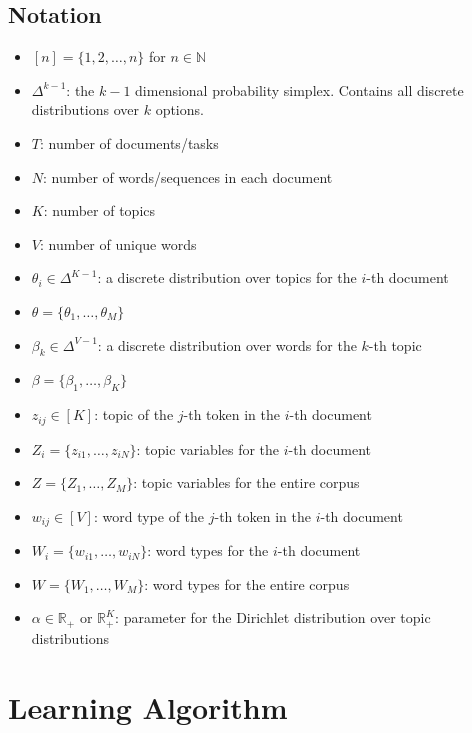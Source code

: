 \documentclass[letterpaper]{article}
\begin{document}
\begin{tcolorbox}
\subsection{Notation}
\begin{itemize}
        \item $[n] = \{1, 2, \dots, n\}$ for $n \in \mathbb{N}$
        \item $\Delta^{k-1}$: the $k-1$ dimensional probability simplex. Contains all discrete distributions over $k$ options.
        \item $T$: number of documents/tasks
        \item $N$: number of words/sequences in each document
        \item $K$: number of topics
        \item $V$: number of unique words
        \item $\theta_i \in \Delta^{K-1}$: a discrete distribution over topics for the $i$-th document
        \item $\theta = \{\theta_1, \dots, \theta_M\}$
        \item $\beta_k \in \Delta^{V-1}$: a discrete distribution over words for the $k$-th topic
        \item $\beta = \{\beta_1, \dots, \beta_K\}$
        \item $z_{ij} \in [K]$: topic of the $j$-th token in the $i$-th document
        \item $Z_i = \{z_{i1}, \dots, z_{iN}\}$: topic variables for the $i$-th document
        \item $Z = \{Z_1, \dots, Z_M\}$: topic variables for the entire corpus
        \item $w_{ij} \in [V]$: word type of the $j$-th token in the $i$-th document
        \item $W_i = \{w_{i1}, \dots, w_{iN}\}$: word types for the $i$-th document
        \item $W = \{W_{1}, \dots, W_{M}\}$: word types for the entire corpus
        \item $\alpha \in \mathbb{R_+}$ or $\mathbb{R}^K_+$: parameter for the Dirichlet distribution over topic distributions
\end{itemize}
\end{tcolorbox}

\section{Learning Algorithm}
\end{document}
